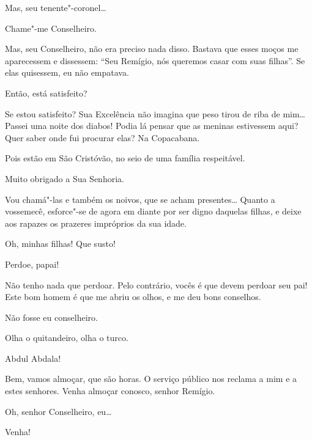 \begin{linenumbers}
  Mas, seu
tenente"-coronel\ldots{}

 Chame"-me Conselheiro.

 Mas, seu Conselheiro, não era preciso nada disso. Bastava que
esses moços me aparecessem e dissessem: ``Seu Remígio, nós queremos
casar com suas filhas''. Se elas quisessem, eu não empatava.

 Então, está satisfeito?

 Se estou satisfeito? Sua Excelência não imagina que peso
tirou de riba de mim\ldots{} Passei uma noite dos diabos! Podia lá pensar que as
meninas estivessem aqui? Quer saber onde fui procurar elas? Na Copacabana.

 Pois estão em São Cristóvão, no seio de uma família respeitável.

 Muito obrigado a Sua Senhoria.

 Vou chamá"-las e também os noivos, que se acham presentes\ldots{}
 Quanto a vossemecê,
esforce"-se de agora em diante por ser digno daquelas filhas, e deixe aos rapazes
os prazeres impróprios da sua idade.  




 Oh, minhas filhas! Que susto!

 Perdoe, papai!

 Não tenho nada que perdoar.  Pelo contrário, vocês é que
devem perdoar seu pai! Este bom homem é que me abriu os olhos, e me deu bons
conselhos.

 Não fosse eu conselheiro.

   Olha o quitandeiro, olha o
turco.

 Abdul Abdala!

 Bem, vamos almoçar, que são horas. O serviço público nos
reclama a mim e a estes senhores. Venha almoçar conosco, senhor Remígio.

 Oh, senhor Conselheiro, eu\ldots{}

 Venha!


\end{linenumbers}
